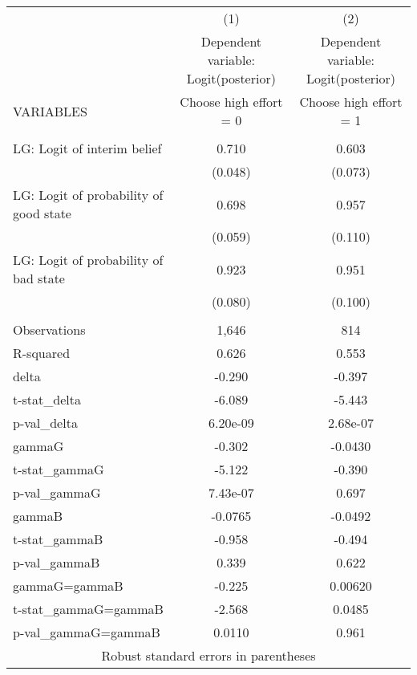 \documentclass[]{article}
\begin{document}
\begin{tabular}{lcc} \hline
 & (1) & (2) \\
 & Dependent variable: Logit(posterior) & Dependent variable: Logit(posterior) \\
VARIABLES & Choose high effort = 0 & Choose high effort = 1 \\ \hline
 &  &  \\
LG: Logit of interim belief & 0.710 & 0.603 \\
 & (0.048) & (0.073) \\
LG: Logit of probability of good state & 0.698 & 0.957 \\
 & (0.059) & (0.110) \\
LG: Logit of probability of bad state & 0.923 & 0.951 \\
 & (0.080) & (0.100) \\
 &  &  \\
Observations & 1,646 & 814 \\
R-squared & 0.626 & 0.553 \\
delta & -0.290 & -0.397 \\
t-stat\_delta & -6.089 & -5.443 \\
p-val\_delta & 6.20e-09 & 2.68e-07 \\
gammaG & -0.302 & -0.0430 \\
t-stat\_gammaG & -5.122 & -0.390 \\
p-val\_gammaG & 7.43e-07 & 0.697 \\
gammaB & -0.0765 & -0.0492 \\
t-stat\_gammaB & -0.958 & -0.494 \\
p-val\_gammaB & 0.339 & 0.622 \\
gammaG=gammaB & -0.225 & 0.00620 \\
t-stat\_gammaG=gammaB & -2.568 & 0.0485 \\
 p-val\_gammaG=gammaB & 0.0110 & 0.961 \\ \hline
\multicolumn{3}{c}{ Robust standard errors in parentheses} \\
\end{tabular}
\end{document}
